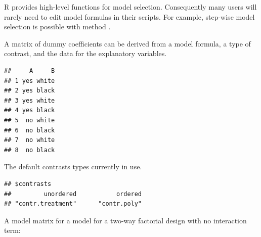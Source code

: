 \documentclass[krantz2]{krantz}\usepackage{knitr}
\begin{document}
\begin{explainbox}
R provides high-level functions for model selection. Consequently many \Rlang users will rarely need to edit model formulas in their scripts. For example, step-wise model selection is possible with \Rlang method .

A matrix of dummy coefficients can be derived from a model formula, a type of contrast, and the data for the explanatory variables.

\begin{knitrout}\footnotesize
{}\color{fgcolor}\begin{kframe}
\begin{alltt}
 \hlkwb{<-} \hlstd{(} \hlstd{=} \hlstd{(}\hlstd{(}\hlstd{,} \hlstd{),} \hlstd{(}\hlstd{,} \hlstd{)),}
                         \hlstd{=} \hlstd{(}\hlstd{(}\hlstd{,} \hlstd{),} \hlstd{))}
\end{alltt}
\begin{verbatim}
##     A     B
## 1 yes white
## 2 yes black
## 3 yes white
## 4 yes black
## 5  no white
## 6  no black
## 7  no white
## 8  no black
\end{verbatim}
\end{kframe}
\end{knitrout}

The default contrasts types currently in use.

\begin{knitrout}\footnotesize
{}\color{fgcolor}\begin{kframe}
\begin{alltt}
\hlstd{(}\hlstd{)}
\end{alltt}
\begin{verbatim}
## $contrasts
##         unordered           ordered 
## "contr.treatment"      "contr.poly"
\end{verbatim}
\end{kframe}
\end{knitrout}

A model matrix for a model for a two-way factorial design with no interaction term:


\end{explainbox}
\end{document}
